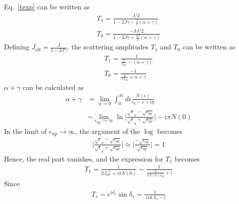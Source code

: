 \documentclass[twoside,11pt]{report}
\numberwithin{equation}{section}
\begin{document}
Eq.~\ref{texp} can be written as
\begin{gather}
	T_1 = \frac{J/2}{1 - 2 J \gamma - \frac{J}{2}\left(\alpha + \gamma\right)}\\
	T_0 = \frac{-3J/2}{1 - 2 J \gamma + \frac{3J}{2}\left(\alpha + \gamma\right)}
\end{gather}
Defining \(J_\text{eff} = \frac{J}{1 - 2J\gamma}\), the scattering amplitudes \(T_1\) and \(T_0\) can be written as
\begin{equation}\begin{aligned}
	T_1 = \frac{1}{\frac{2}{J_\text{eff}} - \left(\alpha + \gamma\right)}\\
T_0 = \frac{-1}{\frac{2}{3J_\text{eff}}+\alpha + \gamma}
\end{aligned}\end{equation}
\(\alpha + \gamma\) can be calculated as 
\begin{equation}\begin{aligned}
\alpha + \gamma &= \lim_{\eta \rightarrow 0}\int_0^\infty d\epsilon \frac{N(\epsilon)}{\epsilon_k - \epsilon+ i\eta} \\
        &\sim\lim_{\epsilon_\text{up} \rightarrow \infty} \ln \bigg\lvert \frac{\sqrt \epsilon_k - \sqrt{\epsilon_\text{up}}}{\sqrt \epsilon_k + \sqrt{\epsilon_\text{up}}}\bigg \rvert - i \pi N(0)
\end{aligned}\end{equation}
In the limit of \(\epsilon_\text{up} \rightarrow \infty\), the argument of the \(\log\) becomes
\begin{equation}\begin{aligned}
\bigg\lvert \frac{\sqrt \epsilon_k - \sqrt{\epsilon_\text{up}}}{\sqrt \epsilon_k + \sqrt{\epsilon_\text{up}}}\bigg \rvert \approx \bigg\lvert \frac{- \sqrt{\epsilon_\text{up}}}{\sqrt{\epsilon_\text{up}}}\bigg \rvert = 1
\end{aligned}\end{equation}
Hence, the real part vanishes, and the expression for \(T_1\) becomes
\begin{equation}\begin{aligned}
T_1 = \frac{1}{2J^{-1}_\text{eff} + i \pi N(0)} \sim \frac{1}{\frac{2}{\pi N(0)J_\text{eff}} + i}
\end{aligned}\end{equation}
Since
\begin{equation}\begin{aligned}
T_s \sim e^{i \delta_s} \sin \delta_s = \frac{1}{\cot \delta_s - i}
\end{aligned}\end{equation}
\end{document}
